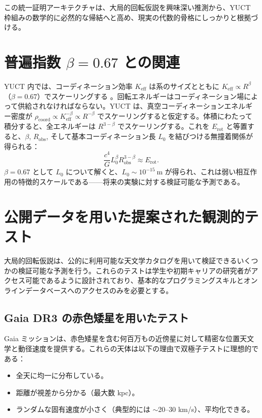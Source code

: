 \documentclass[11pt,a4paper]{article}
\newcommand{\Keff}{K_{\mathrm{eff}}}
\begin{document}
	この統一証明アーキテクチャは、大局的回転仮説を興味深い推測から、YUCT 枠組みの数学的に必然的な帰結へと高め、現実の代数的骨格にしっかりと根拠づける。
	
	\section{普遍指数 \(\beta = 0.67\) との関連}
	
	YUCT 内では、コーディネーション効率 \(\Keff\) は系のサイズとともに \(\Keff \propto R^{\beta}\) （\(\beta = 0.67\)）でスケーリングする \cite{AppendixL}。回転エネルギーはコーディネーション場によって供給されなければならない。YUCT は、真空コーディネーションエネルギー密度が \(\rho_{\text{coord}} \propto \Keff^{-\beta} \propto R^{-\beta}\) でスケーリングすると仮定する。体積にわたって積分すると、全エネルギーは \(R^{3-\beta}\) でスケーリングする。これを \(E_{\text{rot}}\) と等置すると、\(\beta\), \(R_{\text{obs}}\), そして基本コーディネーション長 \(L_0\) を結びつける無撞着関係が得られる：
	\begin{equation}
		\frac{c^4}{G} L_0^{\beta} R_{\text{obs}}^{3-\beta} \approx E_{\text{rot}}.
	\end{equation}
	\(\beta = 0.67\) として \(L_0\) について解くと、\(L_0 \sim 10^{-15}\ \text{m}\) が得られ、これは弱い相互作用の特徴的スケールである——将来の実験に対する検証可能な予測である。
	
	\section{公開データを用いた提案された観測的テスト}
	
	大局的回転仮説は、公的に利用可能な天文学カタログを用いて検証できるいくつかの検証可能な予測を行う。これらのテストは学生や初期キャリアの研究者がアクセス可能であるように設計されており、基本的なプログラミングスキルとオンラインデータベースへのアクセスのみを必要とする。
	
	\subsection{Gaia DR3 の赤色矮星を用いたテスト}
	
	Gaia ミッションは、赤色矮星を含む何百万もの近傍星に対して精密な位置天文学と動径速度を提供する。これらの天体は以下の理由で双極子テストに理想的である：
	\begin{itemize}
		\item 全天に均一に分布している。
		\item 距離が視差から分かる（最大数 kpc）。
		\item ランダムな固有速度が小さく（典型的には \(\sim\)20--30 km/s）、平均化できる。
	\end{itemize}
	
\end{document}
